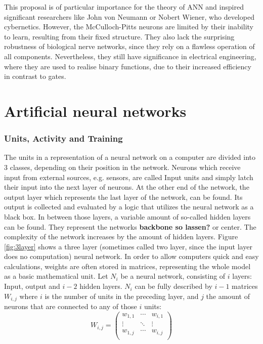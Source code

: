 \documentclass[10pt,a4paper,DIV=11]{scrreprt}
\begin{document}
This proposal is of particular importance for the theory of ANN and inspired significant researchers like John von Neumann or Nobert Wiener, who developed cybernetics. However, the McCulloch-Pitts neurons are limited by their inability to learn, resulting from their fixed structure. They also lack the surprising robustness of biological nerve networks, since they rely on a flawless operation of all components. Nevertheless, they still have significance in electrical engineering, where they are used to realise binary functions, due to their increased efficiency in contrast to gates. 

\chapter{Artificial neural networks}
\subsection{Units, Activity and Training}

The units in a representation of a neural network on a computer are divided into 3 classes, depending on their position in the network. Neurons which receive input from external sources, e.g. sensors, are called Input units and simply latch  their input into the next layer of neurons. At the other end of the network, the output layer which represents the last layer of the network, can be found. Its output is collected and evaluated by a logic that utilizes the neural network as a black box. In between those layers, a variable amount of so-called hidden layers can be found. They represent the networks \textbf{backbone so lassen?} or center. The complexity of the network increases by the amount of hidden layers. Figure \ref{fig:3layer} shows a three layer (sometimes called two layer, since the input layer does no computation) neural network. 
In order to allow computers quick and easy calculations, weights are often stored in matrices, representing the whole model as a basic mathematical unit. Let $N_{i}$ be a neural network, consisting of $i$ layers: Input,  output and $i-2$ hidden layers. $N_{i}$ can be fully described by $i-1$ matrices $W_{i,j}$ where $i$ is the number of units in the preceding layer, and $j$ the amount of neurons that are connected to any of those $i$ units:
\begin{equation}
W_{i,j} = 
\begin{pmatrix}
w_{1,1} & \cdots & w_{i,1} \\
\vdots & \ddots & \vdots \\
w_{1,j} & \cdots & w_{i,j} \\
\end{pmatrix}
\end{equation}
\end{document}
